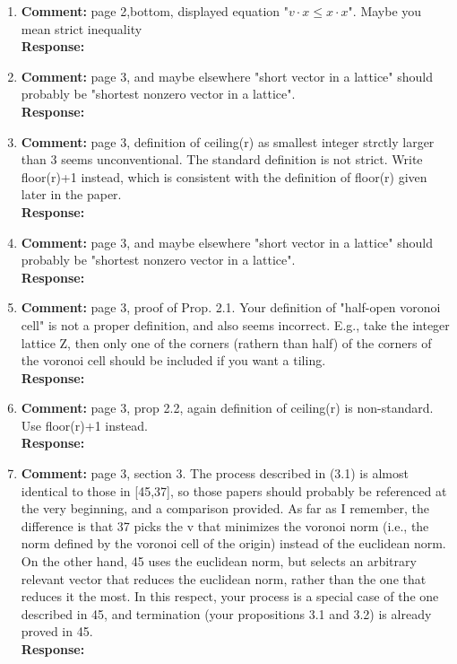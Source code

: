 \documentclass[a4paper,10pt]{article}
\begin{document}
\begin{enumerate}
\item\textbf{Comment:}  
page 2,bottom, displayed equation "$v \cdot x \leq x \cdot x$". Maybe you mean strict inequality 
\\\textbf{Response:}

\item\textbf{Comment:}  
page 3, and maybe elsewhere "short vector in a lattice" should probably be "shortest nonzero vector in a lattice". 
\\\textbf{Response:}

\item\textbf{Comment:}  
page 3, definition of ceiling(r) as smallest integer strctly larger than 3 seems unconventional. The standard definition is not strict. Write floor(r)+1 instead, which is consistent with the definition of floor(r) given later in the paper. 
\\\textbf{Response:}


\item\textbf{Comment:}  
page 3, and maybe elsewhere "short vector in a lattice" should probably be "shortest nonzero vector in a lattice". 
\\\textbf{Response:}

\item\textbf{Comment:}  
page 3, proof of Prop. 2.1. Your definition of "half-open voronoi cell" is not a proper definition, and also seems incorrect. E.g., take the integer lattice Z, then only one of the corners (rathern than half) of the corners of the voronoi cell should be included if you want a tiling. 
\\\textbf{Response:}

\item\textbf{Comment:}  
page 3, prop 2.2, again definition of ceiling(r) is non-standard. Use floor(r)+1 instead. 
\\\textbf{Response:}

\item\textbf{Comment:}  
page 3, section 3. 
The process described in (3.1) is almost identical to those in [45,37], so those papers should probably be referenced at the very beginning, and a comparison provided. As far as I remember, the difference is that 37 picks the v that minimizes the voronoi norm (i.e., the norm defined by the voronoi cell of the origin) instead of the euclidean norm. On the other hand, 45 uses the euclidean norm, but selects an arbitrary relevant vector that reduces the euclidean norm, rather than the one that reduces it the most. In this respect, your process is a special case of the one described in 45, and termination (your propositions 3.1 and 3.2) is already proved in 45. 
\\\textbf{Response:}


\end{enumerate}
\end{document}

